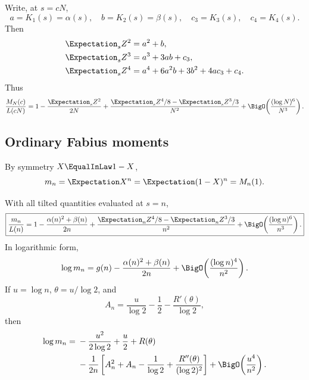 \documentclass[11pt]{article}
\numberwithin{equation}{section}
\theoremstyle{definition}
\theoremstyle{remark}
\begin{document}
Write, at $s=cN$,
\begin{equation}\label{p5:eq:abcd}
 a=K_1(s)=\alpha(s),\quad b=K_2(s)=\beta(s),\quad
 c_3=K_3(s),\quad c_4=K_4(s).
\end{equation}
Then
\begin{align}
 \Expectation_sZ^2&=a^2+b,\label{p5:eq:raw2}\\
 \Expectation_sZ^3&=a^3+3ab+c_3,\label{p5:eq:raw3}\\
 \Expectation_sZ^4&=a^4+6a^2b+3b^2+4ac_3+c_4.\label{p5:eq:raw4}
\end{align}
Thus
\begin{equation}\label{p5:eq:transfer-second}
 \frac{M_N(c)}{L(cN)}=
 1-\frac{\Expectation_sZ^2}{2N}
 +\frac{\Expectation_sZ^4/8-\Expectation_sZ^3/3}{N^2}
 +\BigO\!\left(\frac{(\log N)^6}{N^3}\right).
\end{equation}

\subsection{Ordinary Fabius moments}

By symmetry $X\EqualInLaw1-X$,
\begin{equation}\label{p5:eq:mn-M}
 m_n=\Expectation X^n=\Expectation(1-X)^n=M_n(1).
\end{equation}

\begin{corollary}\label{p5:cor:ordinary-moments}
With all tilted quantities evaluated at $s=n$,
\begin{equation}\label{p5:eq:mn-second}
 \boxed{
 \frac{m_n}{L(n)}=
 1-\frac{\alpha(n)^2+\beta(n)}{2n}
 +\frac{\Expectation_nZ^4/8-\Expectation_nZ^3/3}{n^2}
 +\BigO\!\left(\frac{(\log n)^6}{n^3}\right).}
\end{equation}
In logarithmic form,
\begin{equation}\label{p5:eq:logmn-first}
 \log m_n=g(n)-\frac{\alpha(n)^2+\beta(n)}{2n}
 +\BigO\!\left(\frac{(\log n)^4}{n^2}\right).
\end{equation}
If $u=\log n$, $\theta=u/\log2$, and
\begin{equation}\label{p5:eq:An}
 A_n=\frac{u}{\log2}-\frac12-\frac{R'(\theta)}{\log2},
\end{equation}
then
\begin{align}
 \log m_n={}&-\frac{u^2}{2\log2}+\frac u2+R(\theta)\nonumber\\
 &-\frac1{2n}\left[
 A_n^2+A_n-\frac1{\log2}+\frac{R''(\theta)}{(\log2)^2}
 \right]
 +\BigO\!\left(\frac{u^4}{n^2}\right).
 \label{p5:eq:logmn-R}
\end{align}
\end{corollary}
\end{document}
